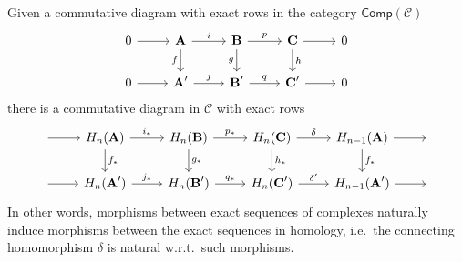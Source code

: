\documentclass[english,letterpaper]{article}%
\numberwithin{equation}{section}
\numberwithin{figure}{section}
\numberwithin{table}{section}
\theoremstyle{definition}
\theoremstyle{definition}
\theoremstyle{definition}
\theoremstyle{plain}
\theoremstyle{plain}
\theoremstyle{plain}
\theoremstyle{plain}
\theoremstyle{remark}
\theoremstyle{remark}
\def\red{\color{red}}
\newcommand{\calC}{\mathcal{C}}
\newcommand{\bm}[1]{\boldsymbol{\mathrm{#1}}}
\newcommand{\PRLsep}{   %
           \noindent\makebox[\linewidth]{
                \resizebox{0.5\linewidth}{1pt}{$\blacklozenge$}}}
\begin{document}

\begin{prop}\label{naturality of connecting hom}
    Given a commutative diagram with exact rows in the category $\mathsf{Comp}(\calC)$
    \[\begin{tikzcd}
        0\arrow[r] & \bm{A}\arrow[r,"i"]\arrow[d,swap,"f"] & \bm{B} \arrow[r,"p"]\arrow[d,swap,"g"] & \bm{C}\arrow[d,"h"]\arrow[r] & 0 \\
       0\arrow[r] & \bm{A}'\arrow[r,"j"] & \bm{B}'\arrow[r,"q"] &\bm{C}' \arrow[r] &0
    \end{tikzcd}\]
    there is a commutative diagram in $\calC$ with exact rows
    \[\begin{tikzcd}
        ~\arrow[r]& H_n(\bm{A})\arrow[r,"i_\ast"]\arrow[d,"f_\ast"] & H_n(\bm{B}) \arrow[r,"p_\ast"]\arrow[d,"g_\ast"] & H_n(\bm{C})\arrow[d,"h_\ast"]\arrow[r,"\delta"] & H_{n-1}(\bm{A})\arrow[d,"f_\ast"]\arrow[r]&~ \\
       ~\arrow[r] & H_n(\bm{A}')\arrow[r,"j_\ast"] & H_n(\bm{B}')\arrow[r,"q_\ast"] &H_n(\bm{C}') \arrow[r,"\delta'"] &H_{n-1}(\bm{A}')\arrow[r]&~ 
    \end{tikzcd}\]
    In other words, morphisms between exact sequences of complexes naturally induce morphisms between the exact sequences in homology, i.e.\ the connecting homomorphism $\delta$ is natural w.r.t.\ such morphisms.
\end{prop}
\end{document}
